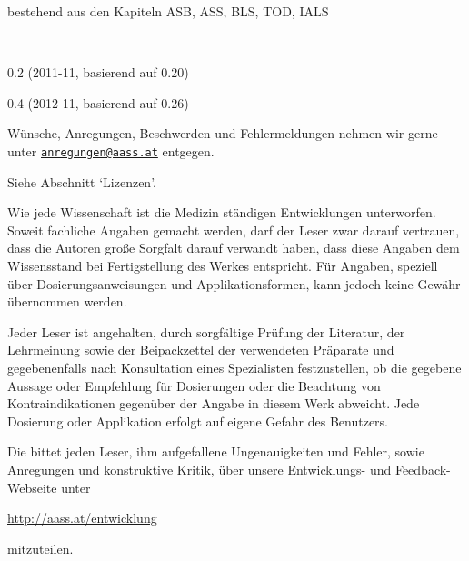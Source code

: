 \begin{description}
  {\scriptsize %
  \begin{compactdesc}
    \item[Megacode] bestehend aus den Kapiteln ASB, ASS, BLS, TOD, IALS
  \end{compactdesc}
  }
  \item[Derivate:]~
  
  {\scriptsize %
  \begin{compactdesc}
    \item[Ernährungspädagogik] 0.2 (2011-11, basierend auf {\AASS} 0.20)
    \item[Ernährungspädagogik] 0.4 (2012-11, basierend auf {\AASS} 0.26)
  \end{compactdesc}
  }
\end{description}


\noindent{}Wünsche, Anregungen, Beschwerden und Fehlermeldungen nehmen wir
gerne unter 
\href{mailto:anregungen@aass.at}{\nolinkurl{anregungen@aass.at}} entgegen.


\noindent{} Siehe Abschnitt \enquote*{Lizenzen}.
% 


\noindent{}Wie jede Wissenschaft ist die Medizin ständigen Entwicklungen
unterworfen. Soweit fachliche Angaben gemacht werden, darf der Leser
zwar darauf vertrauen, dass die Autoren große Sorgfalt
darauf verwandt haben, dass diese Angaben dem Wissensstand bei
Fertigstellung des Werkes entspricht. Für Angaben, speziell
über Dosierungsanweisungen und Applikationsformen, kann jedoch
keine Gewähr übernommen werden. 

Jeder Leser ist angehalten, durch
sorgfältige Prüfung der Literatur, der Lehrmeinung so\-wie der
Beipackzettel der verwendeten Präparate und gegebenenfalls nach
Konsultation eines Spezialisten festzustellen, ob die gegebene
Aussage oder Empfehlung für Dosierungen oder die Beachtung von
Kontraindikationen gegenüber der Angabe in diesem
Werk abweicht. Jede Dosierung oder Applikation erfolgt
auf eigene Gefahr des Benutzers. 

Die {\ARGEAASS} bittet jeden Leser, ihm aufgefallene Ungenauigkeiten und
Fehler, sowie Anregungen und konstruktive Kritik, über unsere 
Entwicklungs- und Feedback-Webseite unter
\begin{center}
\url{http://aass.at/entwicklung}
\end{center} 
mitzuteilen.

